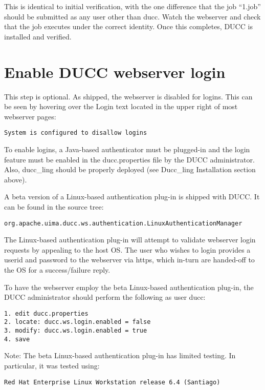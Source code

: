 This is identical to initial verification, with the one difference that the job ``1.job'' should be
submitted as any user other than ducc.  Watch the webserver and check that the job executes
under the correct identity.  Once this completes, DUCC is installed and verified.
 
\section{Enable DUCC webserver login}

    This step is optional.  As shipped, the webserver is disabled for
    logins.  This can be seen by hovering over the Login text located in the
    upper right of most webserver pages: 
\begin{verbatim}
System is configured to disallow logins
\end{verbatim}

    To enable logins, a Java-based authenticator must be plugged-in and the
    login feature must be enabled in the ducc.properties file by the DUCC
    administrator.  Also, ducc\_ling should be properly deployed (see 
    Ducc\_ling Installation section above).
    
    A beta version of a Linux-based authentication plug-in is shipped with DUCC.
    It can be found in the source tree:
\begin{verbatim}
org.apache.uima.ducc.ws.authentication.LinuxAuthenticationManager
\end{verbatim}

    The Linux-based authentication plug-in will attempt to validate webserver
    login requests by appealing to the host OS.  The user who wishes to
    login provides a userid and password to the webserver via https, which
    in-turn are handed-off to the OS for a success/failure reply.
    
    To have the webserver employ the beta Linux-based authentication plug-in,
    the DUCC administrator should perform the following as user ducc:
\begin{verbatim}    
1. edit ducc.properties
2. locate: ducc.ws.login.enabled = false
3. modify: ducc.ws.login.enabled = true
4. save
\end{verbatim}

    Note: The beta Linux-based authentication plug-in has limited testing.
    In particular, it was tested using:
\begin{verbatim}
Red Hat Enterprise Linux Workstation release 6.4 (Santiago)
\end{verbatim}    
    
